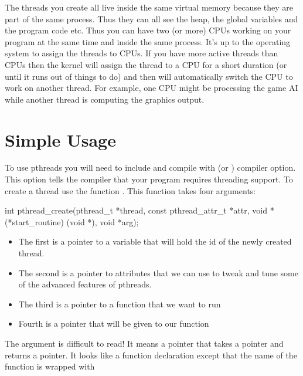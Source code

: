 The threads you create all live inside the same virtual memory because they are part of the same process. Thus they can all see the heap, the global variables and the program code etc. Thus you can have two (or more) CPUs working on your program at the same time and inside the same process. It's up to the operating system to assign the threads to CPUs. If you have more active threads than CPUs then the kernel will assign the thread to a CPU for a short duration (or until it runs out of things to do) and then will automatically switch the CPU to work on another thread. For example, one CPU might be processing the game AI while another thread is computing the graphics output.

\section{Simple Usage}\label{simple-usage}

To use pthreads you will need to include  and compile with  (or ) compiler option. This option tells the compiler that your program requires threading support. To create a thread use the function . This function takes four arguments:

\begin{code}[language=C]
int pthread_create(pthread_t *thread, const pthread_attr_t *attr,
                   void *(*start_routine) (void *), void *arg);
\end{code}

\begin{itemize}
\tightlist
\item
  The first is a pointer to a variable that will hold the id of the newly created thread.
\item
  The second is a pointer to attributes that we can use to tweak and tune some of the advanced features of pthreads.
\item
  The third is a pointer to a function that we want to run
\item
  Fourth is a pointer that will be given to our function
\end{itemize}

The argument  is difficult to read! It means a pointer that takes a  pointer and returns a  pointer. It looks like a function declaration except that the name of the function is wrapped with 

